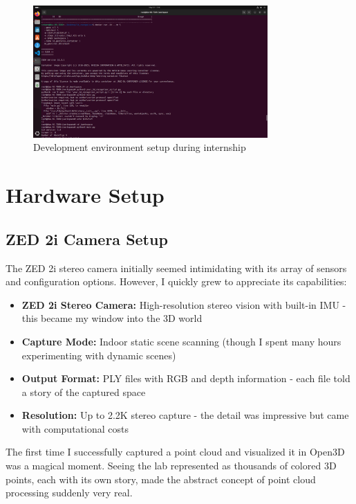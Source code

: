 \documentclass[12pt,a4paper]{report}
\begin{document}
\begin{figure}[htbp]
    \centering
    \includegraphics[width=0.8\textwidth]{figures/development_setup.png}
    \caption{Development environment setup during internship}
    \label{fig:development_setup}
\end{figure}

\section{Hardware Setup}

\subsection{ZED 2i Camera Setup}

The ZED 2i stereo camera initially seemed intimidating with its array of sensors and configuration options. However, I quickly grew to appreciate its capabilities:

\begin{itemize}
    \item \textbf{ZED 2i Stereo Camera:} High-resolution stereo vision with built-in IMU - this became my window into the 3D world
    \item \textbf{Capture Mode:} Indoor static scene scanning (though I spent many hours experimenting with dynamic scenes)
    \item \textbf{Output Format:} PLY files with RGB and depth information - each file told a story of the captured space
    \item \textbf{Resolution:} Up to 2.2K stereo capture - the detail was impressive but came with computational costs
\end{itemize}

The first time I successfully captured a point cloud and visualized it in Open3D was a magical moment. Seeing the lab represented as thousands of colored 3D points, each with its own story, made the abstract concept of point cloud processing suddenly very real.
\end{document}
